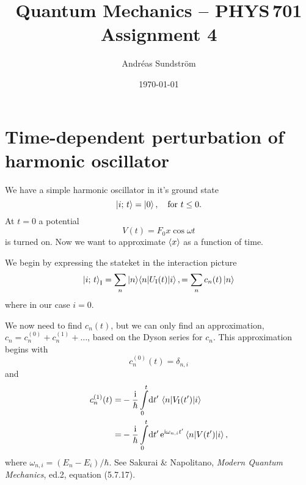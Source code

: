 \documentclass[11pt,letter, swedish, english
]{article}
\begin{document}
\title{Quantum Mechanics -- PHYS\,701 \\
Assignment 4}
\author{Andréas Sundström}
\date{\today}

\maketitle



\section{Time-dependent perturbation of harmonic oscillator}
\newcommand{\I}{\text{I}}
We have a simple harmonic oscillator in it's ground state
\begin{equation}
\ket{i;\,t}=\ket{0}\qcomma
\text{for}\ t\le0.
\end{equation}
At $t=0$ a potential
\begin{equation}
V(t)=F_0x\cos\omega t
\end{equation}
is turned on. Now we want to approximate $\ev{x}$ as a function of time.

We begin by expressing the stateket in the interaction picture
\begin{equation}
\ket{i;\,t}_\I = \sum_n \ket{n}\!\!\mel*{n}{U_\I(t)}{i},
=\sum_n c_n(t)\ket{n}
\end{equation}
where in our case $i=0$. 

We now need to find $c_n(t)$, but we can only find an approximation, 
$c_n=c_n^{(0)}+c_n^{(1)}+\ldots$, based on the Dyson series for
$c_n$. This approximation begins with
\begin{equation}
c_n^{(0)}(t)=\delta_{n,i}
\end{equation}
and
\begin{equation}
\begin{aligned}
c_n^{(1)}(t)=&-\frac{\ii}{\hbar}
\int_0^t\!\rd{t'}\, \mel{n}{V_\I(t')}{i}\\
=&-\frac{\ii}{\hbar}
\int_0^t\!\rd{t'} \,\ee^{\ii\omega_{n,i}t'}\mel{n}{V(t')}{i},
\end{aligned}
\end{equation}
where $\omega_{n,i}=(E_n-E_i)/\hbar$. See Sakurai \& Napolitano,
\textit{Modern Quantum Mechanics}, ed.2, equation (5.7.17).
\end{document}
